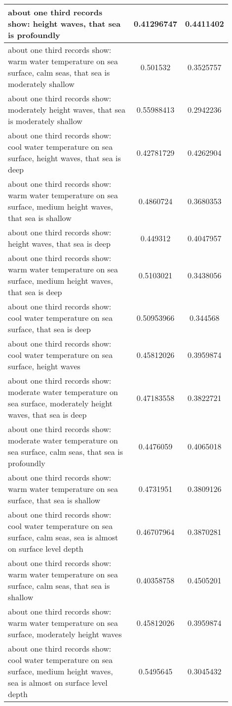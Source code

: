 \documentclass{article}
\begin{document}
\begin{longtable}{|p{0.9\linewidth}|c|c|}
about one third records show: height waves, that sea is profoundly & 0.41296747 & 0.4411402 \\ \hline
about one third records show: warm water temperature on sea surface, calm seas, that sea is moderately shallow & 0.501532 & 0.3525757 \\ \hline
about one third records show: moderately height waves, that sea is moderately shallow & 0.55988413 & 0.2942236 \\ \hline
about one third records show: cool water temperature on sea surface, height waves, that sea is deep & 0.42781729 & 0.4262904 \\ \hline
about one third records show: warm water temperature on sea surface, medium height waves, that sea is shallow & 0.4860724 & 0.3680353 \\ \hline
about one third records show: height waves, that sea is deep & 0.449312 & 0.4047957 \\ \hline
about one third records show: warm water temperature on sea surface, medium height waves, that sea is deep & 0.5103021 & 0.3438056 \\ \hline
about one third records show: cool water temperature on sea surface, that sea is deep & 0.50953966 & 0.344568 \\ \hline
about one third records show: cool water temperature on sea surface, height waves & 0.45812026 & 0.3959874 \\ \hline
about one third records show: moderate water temperature on sea surface, moderately height waves, that sea is deep & 0.47183558 & 0.3822721 \\ \hline
about one third records show: moderate water temperature on sea surface, calm seas, that sea is profoundly & 0.4476059 & 0.4065018 \\ \hline
about one third records show: warm water temperature on sea surface, that sea is shallow & 0.4731951 & 0.3809126 \\ \hline
about one third records show: cool water temperature on sea surface, calm seas, sea is almost on surface level depth & 0.46707964 & 0.3870281 \\ \hline
about one third records show: warm water temperature on sea surface, calm seas, that sea is shallow & 0.40358758 & 0.4505201 \\ \hline
about one third records show: warm water temperature on sea surface, moderately height waves & 0.45812026 & 0.3959874 \\ \hline
about one third records show: cool water temperature on sea surface, medium height waves, sea is almost on surface level depth & 0.5495645 & 0.3045432 \\ \hline

\end{longtable}
\end{document}
